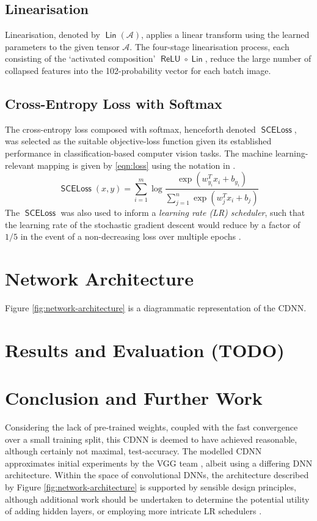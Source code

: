 \documentclass[journal]{IEEEtran}
\DeclareMathOperator\relu{\mathsf{ReLU}}
\DeclareMathOperator\linear{\mathsf{Lin}}
\DeclareMathOperator\loss{\mathsf{SCELoss}}
\begin{document}
\subsection{Linearisation}
Linearisation, denoted by $\linear(\mathcal{A})$, applies a linear transform
using the learned parameters to the given tensor $\mathcal{A}$. The four-stage
linearisation process, each consisting of the `activated composition' $\relu
\circ \linear$, reduce the large number of collapsed features into the
102-probability vector for each batch image.

\subsection{Cross-Entropy Loss with Softmax}
The cross-entropy loss composed with softmax, henceforth denoted $\loss$, was
selected as the suitable objective-loss function given its established
performance in classification-based computer vision tasks. The machine
learning-relevant mapping is given by \eqref{eqn:loss} using the notation in
\cite{Jie:2018}.
\begin{equation}
    \loss(x, y) = \sum_{i=1}^m \log\frac%
        {\exp\left(w^T_{y_i} x_i + b_{y_i}\right)}%
        {\sum_{j=1}^n \exp\left(w^T_j x_i + b_j\right)}%
    \label{eqn:loss}
\end{equation}
The $\loss$ was also used to inform a \emph{learning rate (LR) scheduler}, such
that the learning rate of the stochastic gradient descent would reduce by a
factor of $1/5$ in the event of a non-decreasing loss over multiple epochs
\cite{Konar:2020}.

\section{Network Architecture}
Figure \ref{fig:network-architecture} is a diagrammatic representation of the
CDNN.

\section{Results and Evaluation (TODO)}

\section{Conclusion and Further Work}
Considering the lack of pre-trained weights, coupled with the fast convergence
over a small training split, this CDNN is deemed to have achieved reasonable,
although certainly not maximal, test-accuracy. The modelled CDNN approximates
initial experiments by the VGG team \cite{Nilsback:2008}, albeit using a
differing DNN architecture. Within the space of convolutional DNNs, the
architecture described by Figure \ref{fig:network-architecture} is supported by
sensible design principles, although additional work should be undertaken to
determine the potential utility of adding hidden layers, or employing more
intricate LR schedulers \cite{Loshchilov:2017}.

\clearpage %


\end{document}
